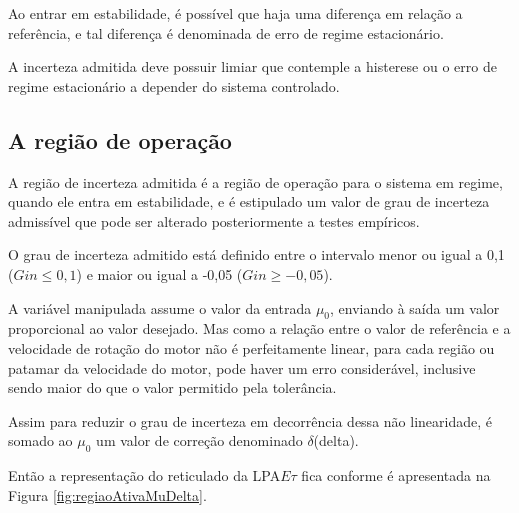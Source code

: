 Ao entrar em estabilidade,
é possível que haja uma diferença em relação a referência,
e tal diferença é denominada de erro de regime estacionário.

A incerteza admitida deve possuir limiar que contemple
a histerese ou o erro de regime estacionário
a depender do sistema controlado. 


\subsection{ A região de operação }

A região de incerteza admitida é a região de operação para o sistema em regime, 
quando ele entra em estabilidade,
e é estipulado um valor de grau de incerteza admissível que 
pode ser alterado posteriormente a testes empíricos.

O grau de incerteza admitido está definido entre
o intervalo menor ou igual a 0,1 ($Gin \le 0,1$) 
e maior ou igual a -0,05 ($Gin \ge -0,05$).




A variável manipulada assume o valor da entrada $\mu_0$,
enviando à saída um valor proporcional ao valor desejado.
Mas como a relação entre o valor de referência e a 
velocidade de rotação do motor não é perfeitamente linear,
para cada região ou patamar da velocidade do motor,
pode haver um erro considerável,
inclusive sendo maior do que o valor permitido pela 
tolerância. 

Assim para reduzir o grau de incerteza
em decorrência dessa não linearidade, 
é somado ao $\mu_0$ um valor de correção denominado $\delta$(delta).

Então a representação do reticulado da LPA$E\tau$ 
fica conforme é apresentada na Figura \ref{fig:regiaoAtivaMuDelta}. 





